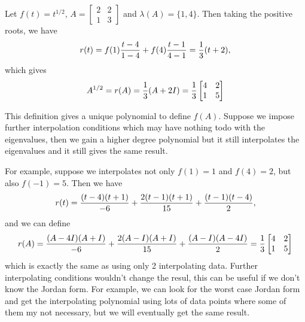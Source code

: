 \documentclass{article}
\begin{document}
\begin{example}
    Let $f(t) = t^{1/2}$, $A = \begin{bmatrix} 2 & 2 \\ 1 & 3
    \end{bmatrix}$ and $\lambda(A) = \{1,4\}$. Then taking the positive
    roots, we have 
    \begin{equation}\notag
        r(t) = f(1) \frac{t-4}{1-4} + f(4)\frac{t-1}{4-1} = \frac{1}{3}(t+2),
    \end{equation}
    which gives 
    \begin{equation}\notag
        A^{1/2} = r(A) = \frac{1}{3}(A + 2I) = \frac{1}{3}
        \begin{bmatrix} 4 & 2 \\ 1 & 5 \end{bmatrix}
    \end{equation}
\end{example}

\begin{note}
    This definition gives a unique polynomial to define $f(A)$. Suppose
    we impose further interpolation conditions which may have nothing
    todo with the eigenvalues, then we gain a higher degree polynomial
    but it still interpolates the eigenvalues and it still gives the
    same result. 
    
    For example, suppose we interpolates not only $f(1) = 1$ and $f(4) =
    2$, but also $f(-1) = 5$. Then we have 
    \begin{equation}\notag
        r(t) = \frac{(t-4)(t+1)}{-6} + \frac{2(t-1)(t+1)}{15} + \frac{(t-1)(t-4)}{2},
    \end{equation}
    and we can define
    \begin{equation}\notag
        r(A) = \frac{(A-4I)(A+I)}{-6} + \frac{2(A-I)(A+I)}{15} + \frac{(A-I)(A-4I)}{2} = \frac{1}{3} \begin{bmatrix} 4 & 2 \\ 1 & 5 \end{bmatrix}
    \end{equation}
    which is exactly the same as using only 2 interpolating data.
    Further interpolating conditions wouldn't change the resul, this can
    be useful if we don't know the Jordan form. For example, we can look
    for the worst case Jordan form and get the interpolating polynomial
    using lots of data points where some of them my not necessary, but
    we will eventually get the same result.
\end{note}
\end{document}
